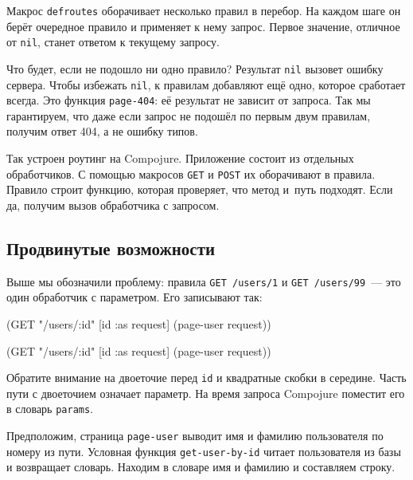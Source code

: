 
Макрос \verb|defroutes| оборачивает несколько правил в перебор. На каждом шаге
он берёт очередное правило и применяет к нему запрос. Первое значение, отличное
от \verb|nil|, станет ответом к текущему запросу.

Что будет, если не подошло ни одно правило? Результат \verb|nil| вызовет
ошибку сервера. Чтобы избежать \verb|nil|, к правилам добавляют ещё одно,
которое сработает всегда. Это функция \verb|page-404|: её результат не
зависит от запроса. Так мы гарантируем, что даже если запрос не подошёл по первым
двум правилам, получим ответ 404, а не ошибку типов.

Так устроен роутинг на Compojure. Приложение состоит из отдельных
обработчиков. С помощью макросов \verb|GET| и \verb|POST| их оборачивают в
правила. Правило строит функцию, которая проверяет, что метод и~путь
подходят. Если да, получим вызов обработчика с запросом.

\subsection{Продвинутые возможности}

Выше мы обозначили проблему: правила \texttt{GET /users\-/1} и \texttt{GET
  /users/99}~--- это один обработчик с параметром. Его записывают так:


\ifnarrow

\begin{english}
  \begin{clojure}
(GET "/users/:id" [id :as request]
    (page-user request))
  \end{clojure}
\end{english}

\else

\begin{english}
  \begin{clojure}
(GET "/users/:id" [id :as request] (page-user request))
  \end{clojure}
\end{english}

\fi

Обратите внимание на двоеточие перед \verb|id| и квадратные скобки в середине.
Часть пути с двоеточием означает параметр. На время запроса Compojure поместит
его в словарь \verb|params|.

Предположим, страница \verb|page-user| выводит имя и фамилию пользователя по
номеру из пути. Условная функция \texttt{get\--user\--by\--id} читает пользователя из
базы и возвращает словарь. Находим в словаре имя и фамилию и составляем строку.

